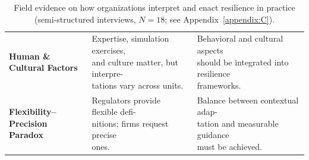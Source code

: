 \begin{table}[H]
\begin{tabular}{p{} p{} p{}}
        \makecell[tl]{\textbf{Human \&} \\ \textbf{Cultural Factors}} & \makecell[tl]{Expertise, simulation exercises,\\ and culture matter, but interpre- \\tations vary across units.} & \makecell[l]{Behavioral and cultural aspects \\should be integrated into resilience\\ frameworks.}\\
        \makecell[tl]{\textbf{Flexibility–Precision} \\ \textbf{Paradox}} & \makecell[tl]{Regulators provide flexible defi-\\nitions; firms request precise \\ ones.} & \makecell[l]{Balance between contextual adap-\\tation and measurable guidance \\ must be achieved.}\\
         \bottomrule
    \end{tabular}
    \caption{Field evidence on how organizations interpret and enact resilience in practice (semi-structured interviews, $N=18$; see Appendix~\ref{appendix:C}).}
    \label{tab:RotaResult}
\end{table}